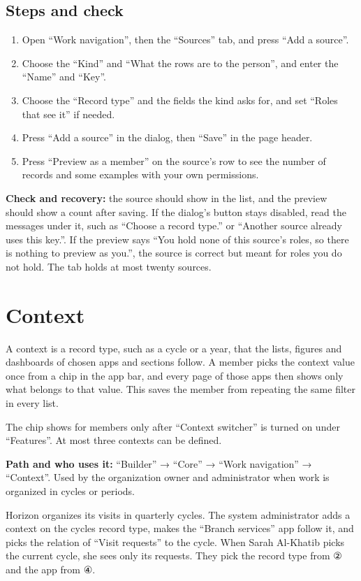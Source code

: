 \subsection{Steps and check}
\begin{enumerate}
\item Open “Work navigation”, then the “Sources” tab, and press “Add a source”.
\item Choose the “Kind” and “What the rows are to the person”, and enter the “Name” and “Key”.
\item Choose the “Record type” and the fields the kind asks for, and set “Roles that see it” if needed.
\item Press “Add a source” in the dialog, then “Save” in the page header.
\item Press “Preview as a member” on the source's row to see the number of records and some examples with your own permissions.
\end{enumerate}

\textbf{Check and recovery:} the source should show in the list, and the preview should show a count after saving. If the dialog's button stays disabled, read the messages under it, such as “Choose a record type.” or “Another source already uses this key.”. If the preview says “You hold none of this source’s roles, so there is nothing to preview as you.”, the source is correct but meant for roles you do not hold. The tab holds at most twenty sources.

\clearpage
\section{Context}
\label{sec:builder-feature-work-navigation-context}

A context is a record type, such as a cycle or a year, that the lists, figures and dashboards of chosen apps and sections follow. A member picks the context value once from a chip in the app bar, and every page of those apps then shows only what belongs to that value. This saves the member from repeating the same filter in every list.

The chip shows for members only after “Context switcher” is turned on under “Features”. At most three contexts can be defined.

\textbf{Path and who uses it:} “Builder” → “Core” → “Work navigation” → “Context”. Used by the organization owner and administrator when work is organized in cycles or periods.

\begin{rcnote}
Horizon organizes its visits in quarterly cycles. The system administrator adds a context on the cycles record type, makes the “Branch services” app follow it, and picks the relation of “Visit requests” to the cycle. When Sarah Al-Khatib picks the current cycle, she sees only its requests. They pick the record type from ② and the app from ④.
\end{rcnote}

